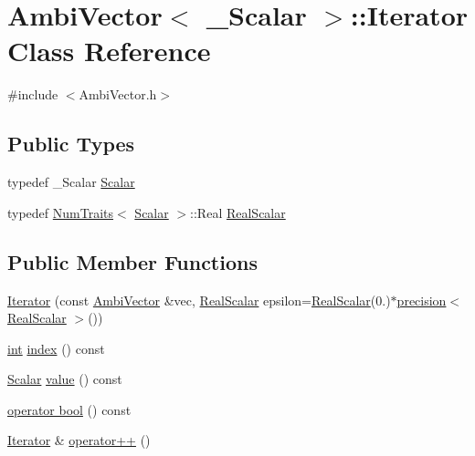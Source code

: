 \hypertarget{class_ambi_vector_1_1_iterator}{\section{Ambi\-Vector$<$ \-\_\-\-Scalar $>$\-:\-:Iterator Class Reference}
\label{class_ambi_vector_1_1_iterator}
}


{\ttfamily \#include $<$Ambi\-Vector.\-h$>$}

\subsection*{Public Types}
\begin{DoxyCompactItemize}
\item 
typedef \-\_\-\-Scalar \hyperlink{class_ambi_vector_1_1_iterator_a4b1d3f851039dfc016760c87ef570a32}{Scalar}
\item 
typedef \hyperlink{struct_num_traits}{Num\-Traits}$<$ \hyperlink{class_ambi_vector_1_1_iterator_a4b1d3f851039dfc016760c87ef570a32}{Scalar} $>$\-::Real \hyperlink{class_ambi_vector_1_1_iterator_acf5b6b8ccac8e159e4787202adc9591a}{Real\-Scalar}
\end{DoxyCompactItemize}
\subsection*{Public Member Functions}
\begin{DoxyCompactItemize}
\item 
\hyperlink{class_ambi_vector_1_1_iterator_a0b05fd3fb88d415fbec72a4e60345f5e}{Iterator} (const \hyperlink{class_ambi_vector}{Ambi\-Vector} \&vec, \hyperlink{class_ambi_vector_1_1_iterator_acf5b6b8ccac8e159e4787202adc9591a}{Real\-Scalar} epsilon=\hyperlink{class_ambi_vector_1_1_iterator_acf5b6b8ccac8e159e4787202adc9591a}{Real\-Scalar}(0.)$\ast$\hyperlink{_math_functions_8h_a3dc1c65cf9dc9b5a7ee66472d0ae83e1}{precision}$<$ \hyperlink{class_ambi_vector_1_1_iterator_acf5b6b8ccac8e159e4787202adc9591a}{Real\-Scalar} $>$())
\item 
\hyperlink{ioapi_8h_a787fa3cf048117ba7123753c1e74fcd6}{int} \hyperlink{class_ambi_vector_1_1_iterator_a21ddfa856f0047f8def20b7166accf84}{index} () const 
\item 
\hyperlink{class_ambi_vector_1_1_iterator_a4b1d3f851039dfc016760c87ef570a32}{Scalar} \hyperlink{class_ambi_vector_1_1_iterator_ade53023cc01750489da800323b83851b}{value} () const 
\item 
\hyperlink{class_ambi_vector_1_1_iterator_add0f5e87efa641fd3f5b7d528b1f5c4f}{operator bool} () const 
\item 
\hyperlink{class_ambi_vector_1_1_iterator}{Iterator} \& \hyperlink{class_ambi_vector_1_1_iterator_aa1c48078ffae4ca6118b88a5e601bfad}{operator++} ()
\end{DoxyCompactItemize}

